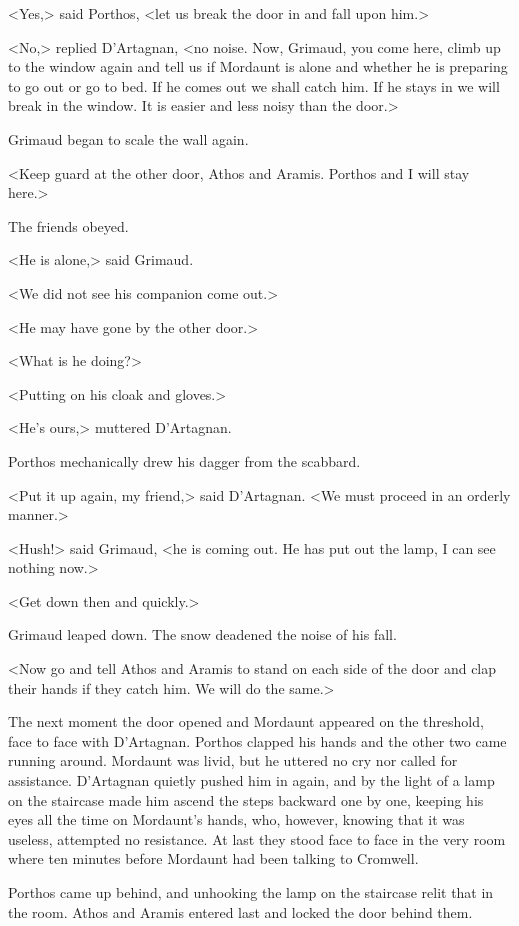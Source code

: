 <Yes,> said Porthos, <let us break the door in and fall upon him.>

<No,> replied D'Artagnan, <no noise. Now, Grimaud, you come here, climb up to the window again and tell us if Mordaunt is alone and whether he is preparing to go out or go to bed. If he comes out we shall catch him. If he stays in we will break in the window. It is easier and less noisy than the door.>

Grimaud began to scale the wall again.

<Keep guard at the other door, Athos and Aramis. Porthos and I will stay here.>

The friends obeyed.

<He is alone,> said Grimaud.

<We did not see his companion come out.>

<He may have gone by the other door.>

<What is he doing?>

<Putting on his cloak and gloves.>

<He's ours,> muttered D'Artagnan.

Porthos mechanically drew his dagger from the scabbard.

<Put it up again, my friend,> said D'Artagnan. <We must proceed in an orderly manner.>

<Hush!> said Grimaud, <he is coming out. He has put out the lamp, I can see nothing now.>

<Get down then and quickly.>

Grimaud leaped down. The snow deadened the noise of his fall.

<Now go and tell Athos and Aramis to stand on each side of the door and clap their hands if they catch him. We will do the same.>

The next moment the door opened and Mordaunt appeared on the threshold, face to face with D'Artagnan. Porthos clapped his hands and the other two came running around. Mordaunt was livid, but he uttered no cry nor called for assistance. D'Artagnan quietly pushed him in again, and by the light of a lamp on the staircase made him ascend the steps backward one by one, keeping his eyes all the time on Mordaunt's hands, who, however, knowing that it was useless, attempted no resistance. At last they stood face to face in the very room where ten minutes before Mordaunt had been talking to Cromwell.

Porthos came up behind, and unhooking the lamp on the staircase relit that in the room. Athos and Aramis entered last and locked the door behind them.

